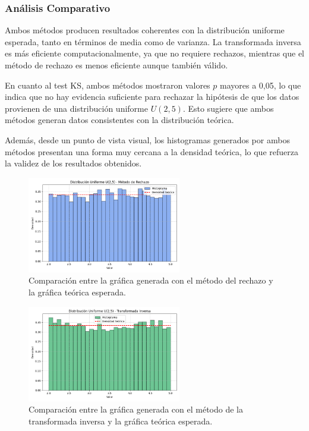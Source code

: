 \documentclass{article}
\begin{document}
\subsubsection{Análisis Comparativo}
Ambos métodos producen resultados coherentes con la distribución uniforme esperada, tanto en términos de media como de varianza. La transformada inversa es más eficiente computacionalmente, ya que no requiere rechazos, mientras que el método de rechazo es menos eficiente aunque también válido.

En cuanto al test KS, ambos métodos mostraron valores $p$ mayores a 0{,}05, lo que indica que no hay evidencia suficiente para rechazar la hipótesis de que los datos provienen de una distribución uniforme $U(2,5)$. Esto sugiere que ambos métodos generan datos consistentes con la distribución teórica.

Además, desde un punto de vista visual, los histogramas generados por ambos métodos presentan una forma muy cercana a la densidad teórica, lo que refuerza la validez de los resultados obtenidos.

\begin{figure}[H]
    \centering
    \includegraphics[width=0.6\textwidth]{visualizaciones/uniforme_rechazo.png}
    \caption{Comparación entre la gráfica generada con el método del rechazo y la gráfica teórica esperada.}
    \label{fig:uniforme_rechazo}
\end{figure}

\begin{figure}[H]
    \centering
    \includegraphics[width=0.6\textwidth]{visualizaciones/uniforme_inversa.png}
    \caption{Comparación entre la gráfica generada con el método de la transformada inversa y la gráfica teórica esperada.}
    \label{fig:uniforme_inversa}
\end{figure}
\end{document}

